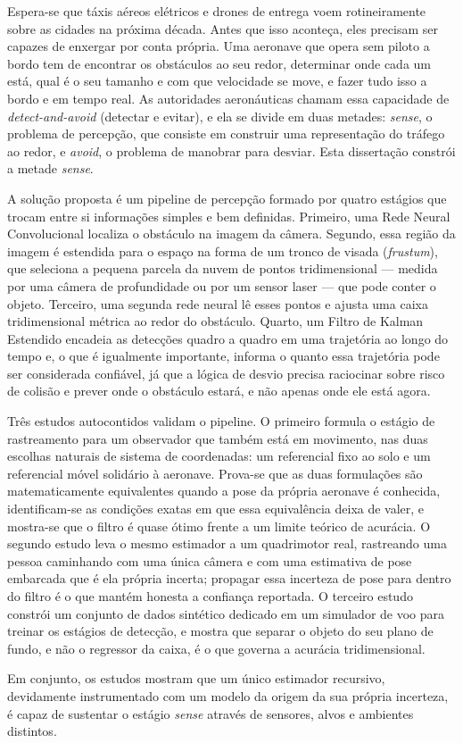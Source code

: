 
Espera-se que táxis aéreos elétricos e drones de entrega voem rotineiramente
sobre as cidades na próxima década. Antes que isso aconteça, eles precisam ser
capazes de enxergar por conta própria. Uma aeronave que opera sem piloto a bordo
tem de encontrar os obstáculos ao seu redor, determinar onde cada um está, qual
é o seu tamanho e com que velocidade se move, e fazer tudo isso a bordo e em
tempo real. As autoridades aeronáuticas chamam essa capacidade de
\emph{detect-and-avoid} (detectar e evitar), e ela se divide em duas metades:
\emph{sense}, o problema de percepção, que consiste em construir uma
representação do tráfego ao redor, e \emph{avoid}, o problema de manobrar para
desviar. Esta dissertação constrói a metade \emph{sense}.

A solução proposta é um pipeline de percepção formado por quatro estágios que
trocam entre si informações simples e bem definidas. Primeiro, uma Rede Neural
Convolucional localiza o obstáculo na imagem da câmera. Segundo, essa região da
imagem é estendida para o espaço na forma de um tronco de visada
(\emph{frustum}), que seleciona a pequena parcela da nuvem de pontos
tridimensional --- medida por uma câmera de profundidade ou por um sensor laser
--- que pode conter o objeto. Terceiro, uma segunda rede neural lê esses pontos e
ajusta uma caixa tridimensional métrica ao redor do obstáculo. Quarto, um Filtro
de Kalman Estendido encadeia as detecções quadro a quadro em uma trajetória ao
longo do tempo e, o que é igualmente importante, informa o quanto essa trajetória
pode ser considerada confiável, já que a lógica de desvio precisa raciocinar
sobre risco de colisão e prever onde o obstáculo estará, e não apenas onde ele
está agora.

Três estudos autocontidos validam o pipeline. O primeiro formula o estágio de
rastreamento para um observador que também está em movimento, nas duas escolhas
naturais de sistema de coordenadas: um referencial fixo ao solo e um referencial
móvel solidário à aeronave. Prova-se que as duas formulações são matematicamente
equivalentes quando a pose da própria aeronave é conhecida, identificam-se as
condições exatas em que essa equivalência deixa de valer, e mostra-se que o
filtro é quase ótimo frente a um limite teórico de acurácia. O segundo estudo
leva o mesmo estimador a um quadrimotor real, rastreando uma pessoa caminhando
com uma única câmera e com uma estimativa de pose embarcada que é ela própria
incerta; propagar essa incerteza de pose para dentro do filtro é o que mantém
honesta a confiança reportada. O terceiro estudo constrói um conjunto de dados
sintético dedicado em um simulador de voo para treinar os estágios de detecção, e
mostra que separar o objeto do seu plano de fundo, e não o regressor da caixa, é
o que governa a acurácia tridimensional.

Em conjunto, os estudos mostram que um único estimador recursivo, devidamente
instrumentado com um modelo da origem da sua própria incerteza, é capaz de
sustentar o estágio \emph{sense} através de sensores, alvos e ambientes
distintos.
